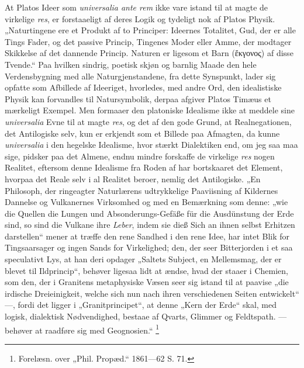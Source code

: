 \documentclass[11pt]{book}
\newcommand{\opage}[1]{\marginnote{\footnotesize\textit{[#1]}}}
\begin{document}
At Platos Ideer som \textit{universalia ante rem} ikke vare istand
til at magte de virkelige \textit{res}, er forstaaeligt af deres
Logik og tydeligt nok af Platos Physik. „Naturtingene ere et
Produkt af to Principer: Ideernes Totalitet, Gud, der er alle Tings
Fader, og det passive Princip, Tingenes Moder eller Amme, der
modtager Skikkelse af det dannende Princip. Naturen er ligesom et
Barn (ἔκγονος) af disse Tvende.“ Paa hvilken sindrig, poetisk
skjøn og barnlig Maade den hele Verdensbygning med alle
Naturgjenstandene, fra dette Synspunkt, lader sig opfatte som
Afbillede af Ideeriget, hvorledes, med andre Ord, den idealistiske
Physik kan forvandles til Natursymbolik, derpaa afgiver Platos
Timæus et mærkeligt Exempel. Men formaaer den platoniske Idealisme
ikke at meddele sine \textit{universalia} Evne til at magte
\textit{res}, og det af den gode Grund, at Realnegationen, det
Antilogiske selv, kun er erkjendt som et Billede paa Afmagten, da
kunne \textit{universalia} i den hegelske Idealisme, hvor stærkt
Dialektiken end,
\opage{188} \setcounter{footnote}{0}%
om jeg saa maa sige, pidsker paa det Almene, endnu mindre forskaffe
de virkelige \textit{res} nogen Realitet, eftersom denne Idealisme
fra Roden af har bortskaaret det Element, hvorpaa det Reale selv i
al Realitet beroer, nemlig det Antilogiske. „En Philosoph, der
ringeagter Naturlærens udtrykkelige Paaviisning af Kildernes
Dannelse og Vulkanernes Virksomhed
og med en Bemærkning som denne: „wie die Quellen die Lungen und
Absonderungs-Gefäße für die Ausdünstung der Erde sind, so sind die
Vulkane ihre \emph{Leber}, indem sie dieß Sich an ihnen selbst
Erhitzen darstellen“ mener at træffe den rene Sandhed i den rene
Idee, har intet Blik for Tingsaarsager og ingen Sands for
Virkelighed; den, der seer Bitterjorden i et saa speculativt Lys,
at han deri opdager
„Saltets Subject, en Mellemsmag, der er blevet til Ildprincip“,
behøver ligesaa lidt at ændse, hvad der staaer i Chemien, som den,
der i Granitens metaphysiske Væsen seer sig istand til at paavise
„die irdische Dreieinigkeit, welche sich nun nach ihren
verschiedenen Seiten entwickelt“ ---, fordi det ligger i
„Granitprincipet“, at denne „Kern der Erde“ skal, med logisk,
dialektisk Nødvendighed, bestaae af Qvarts, Glimmer og Feldtspath.
--- behøver at raadføre sig med Geognosien.“%
\footnote{Forelæsn. over „Phil. Propæd.“ 1861---62 S. 71.}
\end{document}
